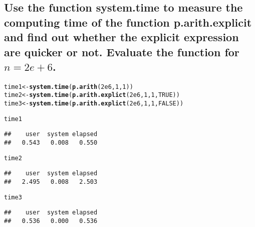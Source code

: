 \documentclass{article}\usepackage[]{graphicx}\usepackage[]{xcolor}
\makeatletter
\newcommand{\hlnum}[1]{\textcolor[rgb]{0.686,0.059,0.569}{#1}}%
\newcommand{\hldef}[1]{\textcolor[rgb]{0.345,0.345,0.345}{#1}}%
\newcommand{\hlkwb}[1]{\textcolor[rgb]{0.69,0.353,0.396}{#1}}%
\newcommand{\hlkwd}[1]{\textcolor[rgb]{0.737,0.353,0.396}{\textbf{#1}}}%
\newenvironment{kframe}{%
 \def\at@end@of@kframe{}%
 \ifinner\ifhmode%
  \def\at@end@of@kframe{\end{minipage}}%
  \begin{minipage}{\columnwidth}%
 \fi\fi%
 \def\FrameCommand##1{\hskip\@totalleftmargin \hskip-\fboxsep
 \colorbox{shadecolor}{##1}\hskip-\fboxsep
     \hskip-\linewidth \hskip-\@totalleftmargin \hskip\columnwidth}%
 \MakeFramed {\advance\hsize-\width
   \@totalleftmargin\z@ \linewidth\hsize
   \@setminipage}}%
 {\par\unskip\endMakeFramed%
 \at@end@of@kframe}
\newenvironment{knitrout}{}{} %
\makeatother
\begin{document}
\subsection{Use the function system.time to measure the computing time of the function p.arith.explicit and find out whether the explicit expression are quicker or not. Evaluate the function for $n = 2e + 6$.}
\begin{knitrout}
\color{fgcolor}\begin{kframe}
\begin{alltt}
\hldef{time1}\hlkwb{<-}\hlkwd{system.time}\hldef{(}\hlkwd{p.arith}\hldef{(}\hlnum{2e6}\hldef{,}\hlnum{1}\hldef{,}\hlnum{1}\hldef{))}
\hldef{time2}\hlkwb{<-}\hlkwd{system.time}\hldef{(}\hlkwd{p.arith.explict}\hldef{(}\hlnum{2e6}\hldef{,}\hlnum{1}\hldef{,}\hlnum{1}\hldef{,}\hlnum{TRUE}\hldef{))}
\hldef{time3}\hlkwb{<-}\hlkwd{system.time}\hldef{(}\hlkwd{p.arith.explict}\hldef{(}\hlnum{2e6}\hldef{,}\hlnum{1}\hldef{,}\hlnum{1}\hldef{,}\hlnum{FALSE}\hldef{))}

\hldef{time1}
\end{alltt}
\begin{verbatim}
##    user  system elapsed 
##   0.543   0.008   0.550
\end{verbatim}
\begin{alltt}
\hldef{time2}
\end{alltt}
\begin{verbatim}
##    user  system elapsed 
##   2.495   0.008   2.503
\end{verbatim}
\begin{alltt}
\hldef{time3}
\end{alltt}
\begin{verbatim}
##    user  system elapsed 
##   0.536   0.000   0.536
\end{verbatim}
\end{kframe}
\end{knitrout}
\end{document}

